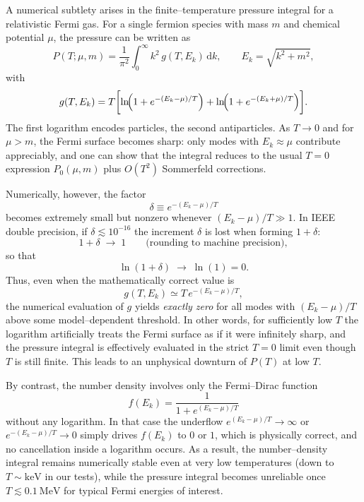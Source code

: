 \documentclass[superscriptaddress,amsmath,floatfix,aps,prc,twocolumn]{revtex4-1}
\begin{document}
A numerical subtlety arises in the finite--temperature pressure
integral for a relativistic Fermi gas. For a single fermion species
with mass $m$ and chemical potential $\mu$, the pressure can be written
as
\begin{equation}
  P(T;\mu,m)
  = \frac{1}{\pi^2}\int_0^\infty k^2\, g(T,E_k)\,\mathrm{d}k,
  \qquad
  E_k = \sqrt{k^2 + m^2},
\end{equation}
with
\begin{equation}
  g(T,E_k)
  = T \biggl[
      \ln\!\Bigl(1 + e^{-(E_k-\mu)/T}\Bigr)
      + \ln\!\Bigl(1 + e^{-(E_k+\mu)/T}\Bigr)
    \biggr] .
\end{equation}
The first logarithm encodes particles, the second antiparticles.
As $T \to 0$ and for $\mu > m$, the Fermi surface becomes sharp:
only modes with $E_k \approx \mu$ contribute appreciably, and one can
show that the integral reduces to the usual $T=0$ expression $P_0(\mu,m)$
plus $O(T^2)$ Sommerfeld corrections.

Numerically, however, the factor
\begin{equation}
  \delta
  \equiv e^{-(E_k-\mu)/T}
\end{equation}
becomes extremely small but nonzero whenever $(E_k-\mu)/T \gg 1$.
In IEEE double precision, if $\delta \lesssim 10^{-16}$ the increment
$\delta$ is lost when forming $1+\delta$:
\begin{equation}
  1+\delta \;\to\; 1
  \qquad\text{(rounding to machine precision)},
\end{equation}
so that
\begin{equation}
  \ln(1+\delta) \;\to\; \ln(1) = 0.
\end{equation}
Thus, even when the mathematically correct value is
\begin{equation}
  g(T,E_k) \simeq T\,e^{-(E_k-\mu)/T},
\end{equation}
the numerical evaluation of $g$ yields \emph{exactly zero} for all modes
with $(E_k-\mu)/T$ above some model--dependent threshold. In other words,
for sufficiently low $T$ the logarithm artificially treats the Fermi
surface as if it were infinitely sharp, and the pressure integral is
effectively evaluated in the strict $T=0$ limit even though $T$ is still
finite. This leads to an unphysical downturn of $P(T)$ at low $T$.

By contrast, the number density involves only the Fermi--Dirac function
\begin{equation}
  f(E_k)
  = \frac{1}{1 + e^{(E_k-\mu)/T}}
\end{equation}
without any logarithm. In that case the underflow
$e^{(E_k-\mu)/T}\to\infty$ or $e^{-(E_k-\mu)/T}\to 0$ simply drives
$f(E_k)$ to $0$ or $1$, which is physically correct, and no cancellation
inside a logarithm occurs. As a result, the number--density integral
remains numerically stable even at very low temperatures (down to
$T\sim\text{keV}$ in our tests), while the pressure integral becomes
unreliable once $T \lesssim 0.1~\mathrm{MeV}$ for typical Fermi energies
of interest.
\end{document}
